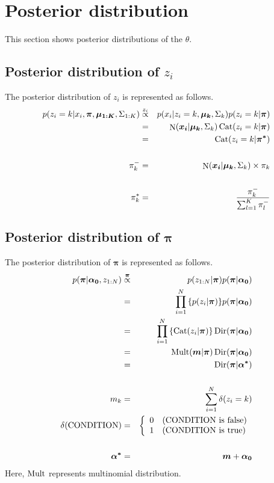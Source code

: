 \documentclass[a4paper]{article}
\DeclareMathOperator{\Cat}{\rm Cat}
\DeclareMathOperator{\Mult}{\rm Mult}
\DeclareMathOperator{\Dir}{\rm Dir}
\DeclareMathOperator{\N}{\rm N}
\newcommand{\proptoas}[1]{\overset{#1}{\propto}}
\begin{document}
	\section{Posterior distribution}
	This section shows posterior distributions of the $\theta$.

	\subsection{Posterior distribution of $z_i$}
	The posterior distribution of $z_i$ is represented as follows.
	\begin{eqnarray}
		p(z_i = k | x_i, \boldsymbol{\pi}, \boldsymbol{\mu_{1:K}}, \Sigma_{1:K})
		&\proptoas{z_i}&
		p(x_i | z_i = k, \boldsymbol{\mu_k}, \Sigma_k) p(z_i = k | \boldsymbol{\pi})\\
		&=&
		\N(\boldsymbol{x_i} | \boldsymbol{\mu_k}, \Sigma_k) \Cat(z_i = k | \boldsymbol{\pi})\\
		&=&
		\Cat(z_i = k | \boldsymbol{\pi^*})\\
		\nonumber \\
		\pi^{-}_{k}
		&=&
		\N(\boldsymbol{x_i} | \boldsymbol{\mu_k}, \Sigma_k) \times \pi_k \\
		\nonumber \\
		\pi^*_k
		&=&
		\frac{\pi^{-}_k}{\sum_{l = 1}^{K}{\pi^{-}_l}}
	\end{eqnarray}

	\subsection{Posterior distribution of $\boldsymbol{\pi}$}
	The posterior distribution of $\boldsymbol{\pi}$ is represented as follows.
	\begin{eqnarray}
		p(\boldsymbol{\pi} | \boldsymbol{\alpha_0}, z_{1:N}) &\proptoas{\boldsymbol{\pi}}& p(z_{1:N} | \boldsymbol{\pi}) p(\boldsymbol{\pi} | \boldsymbol{\alpha_0})\\
		&=&
		\prod_{i=1}^{N}{\left\{ p(z_i | \boldsymbol{\pi}) \right\} } p(\boldsymbol{\pi} | \boldsymbol{\alpha_0})\\
		&=&
		\prod_{i=1}^{N}{\left\{ \Cat(z_i | \boldsymbol{\pi}) \right\} } \Dir(\boldsymbol{\pi} | \boldsymbol{\alpha_0})\\
		&=&
		\Mult(\boldsymbol{m} | \boldsymbol{\pi}) \Dir(\boldsymbol{\pi} | \boldsymbol{\alpha_0})\\
		&=&
		\Dir(\boldsymbol{\pi} | \boldsymbol{\alpha^*})\\
		\nonumber \\
		m_k &=& \sum_{i=1}^{N}{\delta(z_i = k)}\\
		\delta(\text{CONDITION}) &=&
		\left\{
		\begin{array}{ll}
			0 & (\text{CONDITION is false})\\
			1 & (\text{CONDITION is true})
		\end{array}
		\right.\\
		\nonumber\\
		\boldsymbol{\alpha^*} &=& \boldsymbol{m} + \boldsymbol{\alpha_0}
	\end{eqnarray}
	Here, $\Mult$ represents multinomial distribution.
\end{document}
